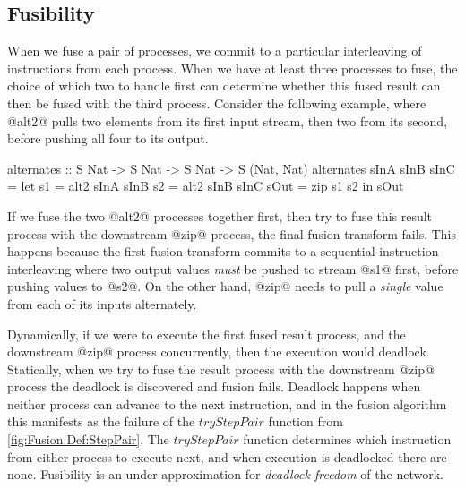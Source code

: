 \subsection{Fusibility}
\label{s:FusionOrder}
When we fuse a pair of processes, we commit to a particular interleaving of instructions from each process.
When we have at least three processes to fuse, the choice of which two to handle first can determine whether this fused result can then be fused with the third process.
Consider the following example, where @alt2@ pulls two elements from its first input stream, then two from its second, before pushing all four to its output.
\begin{haskell}
alternates :: S Nat -> S Nat -> S Nat -> S (Nat, Nat)
alternates sInA sInB sInC
 = let  s1   = alt2 sInA sInB
        s2   = alt2 sInB sInC
        sOut = zip s1 s2
   in   sOut
\end{haskell}
If we fuse the two @alt2@ processes together first, then try to fuse this result process with the downstream @zip@ process, the final fusion transform fails. This happens because the first fusion transform commits to a sequential instruction interleaving where two output values \emph{must} be pushed to stream @s1@ first, before pushing values to @s2@. On the other hand, @zip@ needs to pull a \emph{single} value from each of its inputs alternately.

Dynamically, if we were to execute the first fused result process, and the downstream @zip@ process concurrently, then the execution would deadlock. Statically, when we try to fuse the result process with the downstream @zip@ process the deadlock is discovered and fusion fails. Deadlock happens when neither process can advance to the next instruction, and in the fusion algorithm this manifests as the failure of the $tryStepPair$ function from \cref{fig:Fusion:Def:StepPair}. The $tryStepPair$ function determines which instruction from either process to execute next, and when execution is deadlocked there are none. Fusibility is an under-approximation for \emph{deadlock freedom} of the network.



